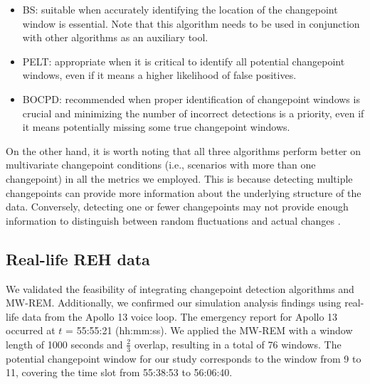 \documentclass[]{interact}
\theoremstyle{plain}%
\theoremstyle{definition}
\theoremstyle{remark}
\begin{document}
    \begin{itemize}
    	\item BS: suitable when accurately identifying the location of the changepoint window is essential. Note that this algorithm needs to be used in conjunction with other algorithms as an auxiliary tool. \\
    	
    	\item PELT: appropriate when it is critical to identify all potential changepoint windows, even if it means a higher likelihood of false positives. \\
    	
    	\item BOCPD: recommended when proper identification of changepoint windows is crucial and minimizing the number of incorrect detections is a priority, even if it means potentially missing some true changepoint windows.
    \end{itemize}
    
    On the other hand, it is worth noting that all three algorithms perform better on multivariate changepoint conditions (i.e., scenarios with more than one changepoint) in all the metrics we employed. This is because detecting multiple changepoints can provide more information about the underlying structure of the data. Conversely, detecting one or fewer changepoints may not provide enough information to distinguish between random fluctuations and actual changes \cite{liReviewChangepointDetection2019}.
    
	\subsection{Real-life REH data} \label{res:Apollo 13}
	
	\hspace{0.28cm} We validated the feasibility of integrating changepoint detection algorithms and MW-REM. Additionally, we confirmed our simulation analysis findings using real-life data from the Apollo 13 voice loop. The emergency report for Apollo 13 occurred at $t$ = 55:55:21 (hh:mm:ss). We applied the MW-REM with a window length of 1000 seconds and $\frac{2}{3}$ overlap, resulting in a total of 76 windows. The potential changepoint window for our study corresponds to the window from 9 to 11, covering the time slot from 55:38:53 to 56:06:40. \\
	
\end{document}
